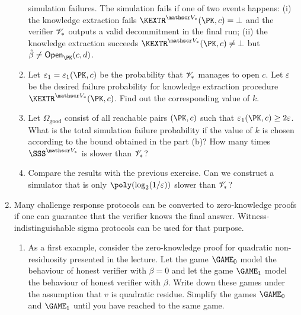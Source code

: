 \documentclass{article}
\begin{document}
\begin{enumerate}
\begin{enumerate}
      simulation failures. The simulation fails if one of two events
      happens: (i) the knowledge extraction fails
      $\KEXTR^{\VERIFIER_*}(\PK,c)=\bot$ and the verifier
      $\mathscr{V}_*$ outputs a valid decommitment in the final run;
      (ii) the knowledge extraction succeeds
      $\KEXTR^{\VERIFIER_*}(\PK,c)\neq \bot$ but $\hat{\beta}\neq\OPEN_\PK(c,d)$.
    \item Let $\varepsilon_1=\varepsilon_1(\PK,c)$ be the probability
      that $\mathscr{V}_*$ manages to open $c$. Let $\varepsilon$ be the
      desired failure probability for knowledge extraction procedure
      $\KEXTR^{\VERIFIER_*}(\PK,c)$. Find out the corresponding value of $k$.
    \item Let $\Omega_{\mathrm{good}}$ consist of all reachable pairs
      $(\PK,c)$ such that $\varepsilon_1(\PK,c)\geq 2\varepsilon$.
      What is the total simulation failure probability if the value of
      $k$ is chosen according to the bound obtained in the part (b)?
      How many times $\SSS^{\VERIFIER_*}$ is slower than
      $\mathscr{V}_*$?
    \item Compare the results with the previous exercise. Can we
      construct a simulator that is only
      $\poly(\log_2(1/\varepsilon))$ slower than $\mathscr{V}_*$?

    \end{enumerate}

  \item Many challenge response protocols can be converted to
    zero-knowledge proofs if one can guarantee that the verifier knows
    the final answer.  Witness-indistinguishable sigma protocols can
    be used for that purpose.
    \begin{enumerate} 
    \item As a first example, consider the zero-knowledge proof for
      quadratic non-residuosity presented in the lecture. Let the game
      $\GAME_0$ model the behaviour of honest verifier with $\beta=0$
      and let the game $\GAME_1$ model the behaviour of honest
      verifier with $\beta$. Write down these games under the
      assumption that $v$ is quadratic residue. Simplify the games
      $\GAME_0$ and $\GAME_1$ until you have reached to the same game.


\end{enumerate}
\end{enumerate}
\end{document}
